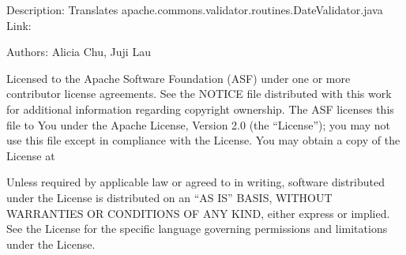 \documentclass[letterpaper,10pt,english]{sphinxmanual}
\begin{document}
\sphinxAtStartPar
Description: Translates apache.commons.validator.routines.DateValidator.java
Link: 

\sphinxAtStartPar
Authors: Alicia Chu, Juji Lau
\begin{description}
\sphinxAtStartPar
Licensed to the Apache Software Foundation (ASF) under one or more
contributor license agreements. See the NOTICE file distributed with
this work for additional information regarding copyright ownership.
The ASF licenses this file to You under the Apache License, Version 2.0
(the “License”); you may not use this file except in compliance with
the License. You may obtain a copy of the License at
\begin{quote}

\sphinxAtStartPar
{}
\end{quote}

\sphinxAtStartPar
Unless required by applicable law or agreed to in writing, software
distributed under the License is distributed on an “AS IS” BASIS,
WITHOUT WARRANTIES OR CONDITIONS OF ANY KIND, either express or implied.
See the License for the specific language governing permissions and
limitations under the License.

\end{description}
\end{document}
